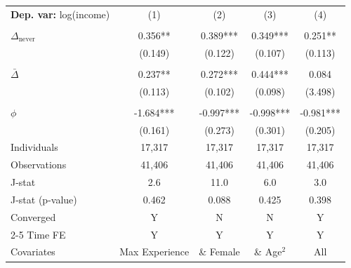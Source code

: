 \begin{tabular}{l cccc} \toprule  \textbf{Dep. var:}  log(income) 
                    &\multicolumn{1}{c}{(1)}   &\multicolumn{1}{c}{(2)}   &\multicolumn{1}{c}{(3)}   &\multicolumn{1}{c}{(4)}   \\
                    &               &               &               &               \\
\addlinespace
$\Delta_{\text{never}}$&       0.356** &       0.389***&       0.349***&       0.251** \\
                    &     (0.149)   &     (0.122)   &     (0.107)   &     (0.113)   \\
                    &               &               &               &               \\
\addlinespace
$\bar{\Delta}$      &       0.237** &       0.272***&       0.444***&       0.084   \\
                    &     (0.113)   &     (0.102)   &     (0.098)   &     (3.498)   \\
                    &               &               &               &               \\
\addlinespace
$\phi$              &      -1.684***&      -0.997***&      -0.998***&      -0.981***\\
                    &     (0.161)   &     (0.273)   &     (0.301)   &     (0.205)   \\
\addlinespace
Individuals         &      17,317   &      17,317   &      17,317   &      17,317   \\
Observations        &      41,406   &      41,406   &      41,406   &      41,406   \\
J-stat              &         2.6   &        11.0   &         6.0   &         3.0   \\
J-stat (p-value)    &       0.462   &       0.088   &       0.425   &       0.398   \\
Converged           &           Y   &           N   &           N   &           Y   \\
\cmidrule{2-5} Time FE & Y & Y & Y & Y \\ Covariates & Max Experience & \& Female & \& Age$^2$ & All \\ \bottomrule \end{tabular}
